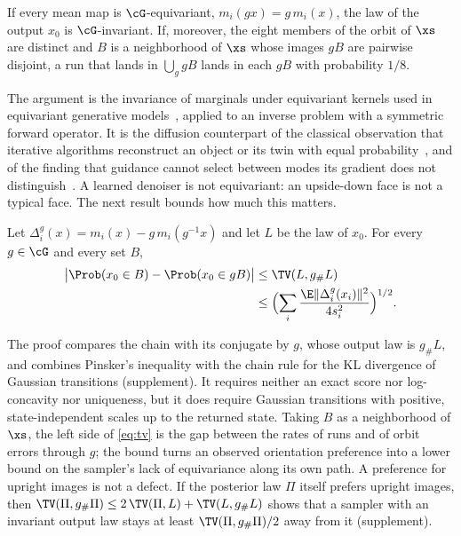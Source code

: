 \begin{theorem}
\label{thm:equivariant}
If every mean map is $\cG$-equivariant, $m_i(gx)=g\,m_i(x)$, the law of the output $x_0$ is $\cG$-invariant.
If, moreover, the eight members of the orbit of $\xs$ are distinct and $B$ is a neighborhood of $\xs$ whose images $gB$ are pairwise disjoint, a run that lands in $\bigcup_g gB$ lands in each $gB$ with probability $1/8$.
\end{theorem}

The argument is the invariance of marginals under equivariant kernels used in equivariant generative models~\cite{xu2022geodiff,hoogeboom2022edm}, applied to an inverse problem with a symmetric forward operator.
It is the diffusion counterpart of the classical observation that iterative algorithms reconstruct an object or its twin with equal probability~\cite{fienup1986stagnation}, and of the finding that guidance cannot select between modes its gradient does not distinguish~\cite{dandapanthula2026tilting}.
A learned denoiser is not equivariant: an upside-down face is not a typical face.
The next result bounds how much this matters.

\begin{theorem}
\label{thm:tv}
Let $\Delta^g_i(x)=m_i(x)-g\,m_i(g^{-1}x)$ and let $L$ be the law of $x_0$.
For every $g\in\cG$ and every set $B$,
\begin{align}
\bigl|\Prob(x_0\in B)-\Prob(x_0\in gB)\bigr| &\le \TV(L,g_\#L)\notag\\
&\le\Bigl(\sum_i\frac{\E\|\Delta^g_i(x_i)\|^2}{4s_i^2}\Bigr)^{1/2}.
\label{eq:tv}
\end{align}
\end{theorem}

The proof compares the chain with its conjugate by $g$, whose output law is $g_\#L$, and combines Pinsker's inequality with the chain rule for the KL divergence of Gaussian transitions (supplement).
It requires neither an exact score nor log-concavity nor uniqueness, but it does require Gaussian transitions with positive, state-independent scales up to the returned state.
Taking $B$ as a neighborhood of $\xs$, the left side of \cref{eq:tv} is the gap between the rates of \good runs and of orbit errors through $g$; the bound turns an observed orientation preference into a lower bound on the sampler's lack of equivariance along its own path.
A preference for upright images is not a defect.
If the posterior law $\Pi$ itself prefers upright images, then $\TV(\Pi,g_\#\Pi)\le2\,\TV(\Pi,L)+\TV(L,g_\#L)$ shows that a sampler with an invariant output law stays at least $\TV(\Pi,g_\#\Pi)/2$ away from it (supplement).

